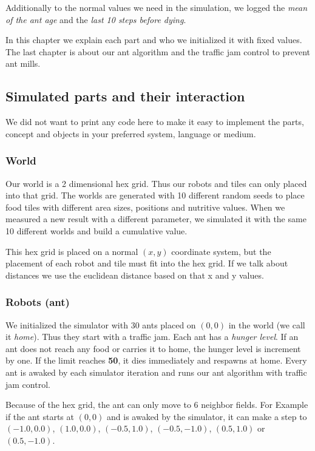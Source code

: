 Additionally to the normal values we need in the simulation, we logged
the \emph{mean of the ant age} and the \emph{last 10 steps before
dying}.

In this chapter we explain each part and who we initialized it with
fixed values. The last chapter is about our ant algorithm and the
traffic jam control to prevent ant mills.

\subsection{Simulated parts and their
interaction}\label{simulated-parts-and-their-interaction}

We did not want to print any code here to make it easy to implement the
parts, concept and objects in your preferred system, language or medium.

\subsubsection{World}\label{world}

Our world is a 2 dimensional hex grid. Thus our robots and tiles can
only placed into that grid. The worlds are generated with 10 different
random seeds to place food tiles with different area sizes, positions
and nutritive values. When we measured a new result with a different
parameter, we simulated it with the same 10 different worlds and build a
cumulative value.

This hex grid is placed on a normal \((x,y)\) coordinate system, but the
placement of each robot and tile must fit into the hex grid. If we talk
about distances we use the euclidean distance based on that x and y
values.

\subsubsection{Robots (ant)}\label{robots-ant}

We initialized the simulator with 30 ants placed on \((0,0)\) in the
world (we call it \emph{home}). Thus they start with a traffic jam. Each
ant has a \emph{hunger level}. If an ant does not reach any food or
carries it to home, the hunger level is increment by one. If the limit
reaches \textbf{50}, it dies immediately and respawns at home. Every ant
is awaked by each simulator iteration and runs our ant algorithm with
traffic jam control.

Because of the hex grid, the ant can only move to 6 neighbor fields. For
Example if the ant starts at \((0,0)\) and is awaked by the simulator,
it can make a step to \((-1.0, 0.0)\), \((1.0, 0.0)\), \((-0.5, 1.0)\),
\((-0.5, -1.0)\), \((0.5, 1.0)\) or \((0.5, -1.0)\).

